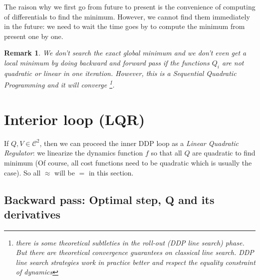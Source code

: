 \documentclass{report}
\newtheorem*{remark}{Remark}
\begin{document}
The raison why we first go from future to present is the convenience of computing of differentials to find the minimum. However, we cannot find them immediately in the future: we need to wait the time goes by to compute the minimum from present one by one.

\begin{remark}	
	We don't search the exact global minimum and we don't even get a local minimum by doing backward and forward pass if the functions $Q_i$ are not quadratic or linear in one iteration. However, this is a \emph{Sequential Quadratic Programming} and it will converge \footnote{there is some theoretical subtleties in the roll-out (DDP line search) phase. But there are theoretical convergence guarantees on classical line search. DDP line search strategies work in practice better and respect the equality constraint of dynamics}.
\end{remark}
\section{Interior loop (LQR)}
If $Q, V \in \mathscr{C}^2 $, then we can proceed the inner DDP loop as a \emph{Linear Quadratic Regulator}: we linearize the dynamics function $f$ so that all $Q$ are quadratic to find minimum (Of course, all cost functions need to be quadratic which is usually the case). So all $\approx$ will be $=$ in this section.
\subsection{Backward pass: Optimal step, Q and its derivatives}
%
%
%
%
\end{document}

